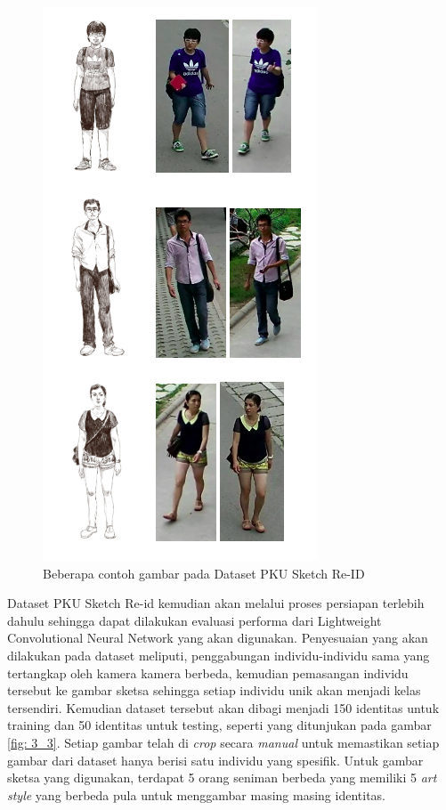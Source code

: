 \begin{figure}  [!htb]
	\centering
	\includegraphics[scale=0.35]{img/ExamplesSketchReID.png}
	\caption{Beberapa contoh gambar pada Dataset PKU Sketch Re-ID}
	\label{fig: 3_2}
\end{figure}

Dataset PKU Sketch \cite{cit:15} Re-id kemudian akan melalui proses persiapan terlebih dahulu sehingga dapat dilakukan evaluasi performa dari Lightweight Convolutional Neural Network yang akan digunakan. Penyesuaian yang akan dilakukan pada dataset meliputi, penggabungan individu-individu sama yang tertangkap oleh kamera kamera berbeda, kemudian pemasangan individu tersebut ke gambar sketsa sehingga setiap individu unik akan menjadi kelas tersendiri. Kemudian dataset tersebut akan dibagi menjadi 150 identitas untuk training dan 50 identitas untuk testing, seperti yang ditunjukan pada gambar \ref{fig: 3_3}. Setiap gambar telah di \textit{crop} secara \textit{manual} untuk memastikan setiap gambar dari dataset hanya berisi satu individu yang spesifik. Untuk gambar sketsa yang digunakan, terdapat 5 orang seniman berbeda yang memiliki 5 \textit{art style} yang berbeda pula untuk menggambar masing masing identitas. 

